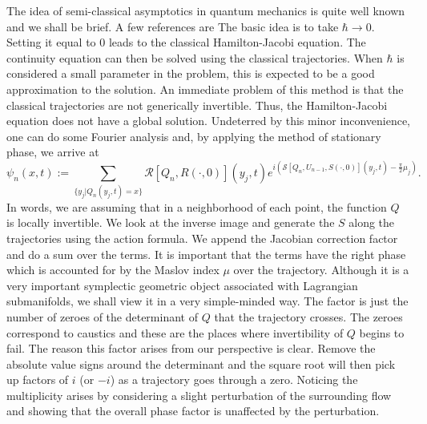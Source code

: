 \documentclass[11pt]{article}
\theoremstyle{remark}
\begin{document}
The idea of semi-classical asymptotics in quantum mechanics is quite
well known and we shall be brief. A few references are \cite{Arn89,
  Mas80, dG98} The basic
idea is to take $\hbar \to 0$. Setting it equal to 0 leads to the
classical Hamilton-Jacobi equation. The continuity equation can then
be solved using the classical trajectories. When $\hbar$ is considered
a small
parameter in the problem, this is expected to be a good approximation
to the solution. An immediate problem of this method is that the
classical trajectories are not generically invertible. Thus, the
Hamilton-Jacobi equation does not have a global solution. Undeterred
by this minor inconvenience, one can do some Fourier analysis and,
 by applying the method of stationary phase, we arrive at 
\[
{\ensuremath{\psi}}_n (x, t)  \ensuremath{:=} \sum_{ \{y_j | Q_n(y_j, t) = x \} } \mathcal{R} [Q_n,
 R(\cdot,0)] (y_j,  t)  
e^{i(\mathcal{S}[Q_n, U_{n-1}, S(\cdot, 0)] (y_j, t) -
 \frac{\pi}{2} \mu_j)}.
\]
In words, we are assuming that in a neighborhood of each point, the
function $Q$ is locally invertible. We look at the inverse image and
generate the $S$ along the trajectories using the action formula. We
append the Jacobian correction factor and do a sum over the terms. It
is important that the terms have the right phase which is accounted
for by
the Maslov index $\mu$ over the trajectory. Although it is a very
important symplectic geometric object associated with Lagrangian
submanifolds,  we shall view it in a very
simple-minded way. The factor is just the number of zeroes of the
determinant of $Q$ that the trajectory crosses. The zeroes correspond
to caustics and these are the places where invertibility of $Q$ begins
to fail. The reason this factor arises from our perspective is
clear. Remove the absolute value signs around the determinant and the
square root will then pick up factors of $i$ (or $-i$)  as a
trajectory goes through a zero. Noticing the multiplicity arises by
considering a slight perturbation of the surrounding flow and showing
that the overall phase factor is unaffected by the perturbation.

\clearpage


\end{document}
